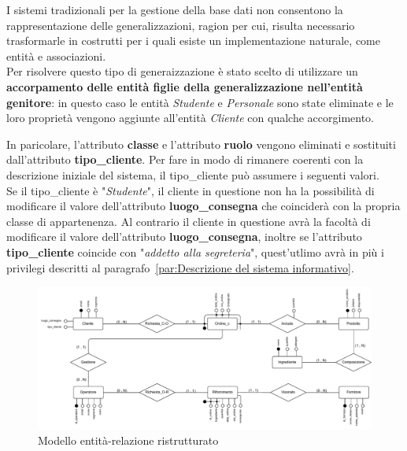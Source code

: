 \documentclass[12pt,a4paper]{article}
\begin{document}
    \vspace{8pt}
    \noindent
    I sistemi tradizionali per la gestione della base dati non consentono la rappresentazione delle generalizzazioni, ragion per cui, risulta necessario trasformarle in costrutti per i quali esiste un implementazione naturale, come entità e associazioni.\\
    Per risolvere questo tipo di generaizzazione è stato scelto di utilizzare un \textbf{accorpamento delle entità figlie della generalizzazione nell'entità genitore}: in questo caso le entità \textit{Studente} e \textit{Personale} sono state eliminate e le loro proprietà vengono aggiunte all'entità \textit{Cliente} con qualche accorgimento.
    
    \vspace{8pt}
    \noindent
    In paricolare, l'attributo \textbf{classe} e l'attributo \textbf{ruolo} vengono eliminati e sostituiti dall'attributo \textbf{tipo\_cliente}. Per fare in modo di rimanere coerenti con la descrizione iniziale del sistema, il tipo\_cliente può assumere i seguenti valori.\\
    Se il tipo\_cliente è "\textit{Studente}", il cliente in questione non ha la possibilità di modificare il valore dell'attributo \textbf{luogo\_consegna} che coinciderà con la propria classe di appartenenza.
    Al contrario il cliente in questione avrà la facoltà di modificare il valore dell'attributo \textbf{luogo\_consegna}, inoltre se l'attributo \textbf{tipo\_cliente} coincide con "\textit{addetto alla segreteria}", quest'utlimo avrà in più i privilegi descritti al paragrafo~\ref{par:Descrizione del sistema informativo}.\\
    \begin{figure}[H]
        \centering
        \vspace{-20pt}  %
        \includegraphics[width=\textwidth]{figures/Conceptual_model_2.pdf}
        \vspace{-20pt}  %
        \caption{Modello entità-relazione ristrutturato}
        \label{fig:Conceptual_model2}
    \end{figure} 
    
\end{document}
